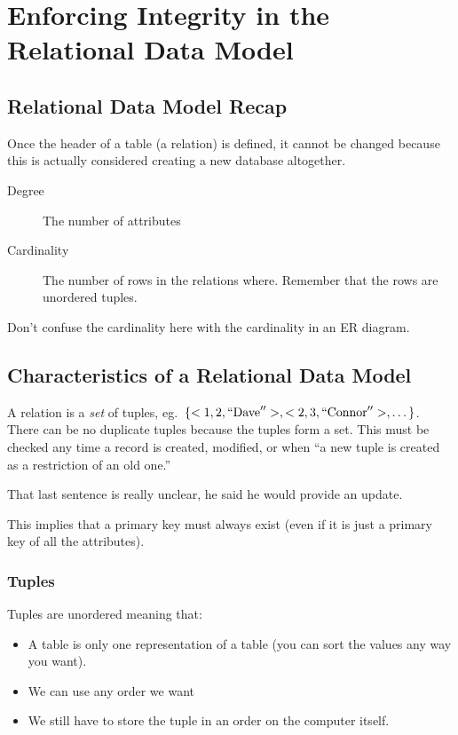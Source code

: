 \section{Enforcing Integrity in the Relational Data Model}\label{sec:enforcing_integrity_in_the_relational_data_model}

\subsection{Relational Data Model Recap}\label{sub:relational_data_model_recap}

Once the header of a table (a relation) is defined, it cannot be changed because this is actually considered creating a new database altogether.
\begin{description}
    \item[Degree] The number of attributes
    \item[Cardinality] The number of rows in the relations where. Remember that the rows are unordered tuples.
\end{description}
\begin{note}
    Don't confuse the cardinality here with the cardinality in an ER diagram.
\end{note}

\subsection{Characteristics of a Relational Data Model}\label{sub:characteristics_of_a_relational_data_model}

A relation is a \emph{set} of tuples, eg.\ \(\{<1, 2, ``\text{Dave}''>, <2, 3, ``\text{Connor}''>, \dots\}\).
There can be no duplicate tuples because the tuples form a set.
This must be checked any time a record is created, modified, or when ``a new tuple is created as a restriction of an old one.''
\begin{note}
    That last sentence is really unclear, he said he would provide an update.
\end{note}
This implies that a primary key must always exist (even if it is just a primary key of all the attributes).

\subsubsection{Tuples}\label{ssub:tuples}

Tuples are unordered meaning that:
\begin{itemize}
    \item A table is only one representation of a table (you can sort the values any way you want).
    \item We can use any order we want
    \item We still have to store the tuple in an order on the computer itself.
\end{itemize}

